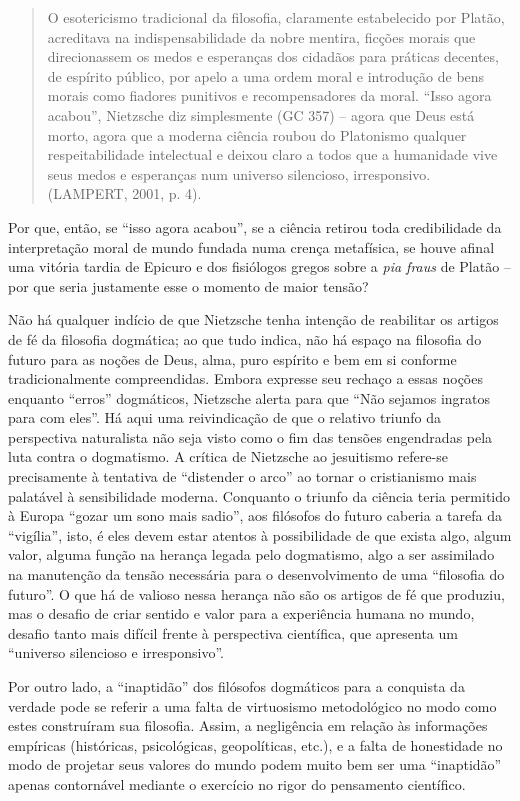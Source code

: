 \documentclass[
	12pt,				%
	openright,			%
	oneside,			%
	a4paper,			%
	english,			%
	french,				%
	spanish,			%
	brazil				%
	]{abntex2}
\begin{document}
\begin{quotation}
O esotericismo tradicional da filosofia, claramente estabelecido por Platão, acreditava na indispensabilidade da nobre mentira, ficções morais que direcionassem os medos e esperanças dos cidadãos para práticas decentes, de espírito público, por apelo a uma ordem moral e introdução de bens morais como fiadores punitivos e recompensadores da moral. “Isso agora acabou”, Nietzsche diz simplesmente (GC 357) – agora que Deus está morto, agora que a moderna ciência roubou do Platonismo qualquer respeitabilidade intelectual e deixou claro a todos que a humanidade vive seus medos e esperanças num universo silencioso, irresponsivo. (LAMPERT, 2001, p. 4).
\end{quotation}

Por que, então, se “isso agora acabou”, se a ciência retirou toda credibilidade da interpretação moral de mundo fundada numa crença metafísica, se houve afinal uma vitória tardia de Epicuro e dos fisiólogos gregos sobre a \textit{pia fraus} de Platão – por que seria justamente esse o momento de maior tensão?

	Não há qualquer indício de que Nietzsche tenha intenção de reabilitar os artigos de fé da filosofia dogmática; ao que tudo indica, não há espaço na filosofia do futuro para as noções de Deus, alma, puro espírito e bem em si conforme tradicionalmente compreendidas. Embora expresse seu rechaço a essas noções enquanto “erros” dogmáticos, Nietzsche alerta para que “Não sejamos ingratos para com eles”. Há aqui uma reivindicação de que o relativo triunfo da perspectiva naturalista não seja visto como o fim das tensões engendradas pela luta contra o dogmatismo. A crítica de Nietzsche ao jesuitismo refere-se precisamente à tentativa de “distender o arco” ao tornar o cristianismo mais palatável à sensibilidade moderna. Conquanto o triunfo da ciência teria permitido à Europa “gozar um sono mais sadio”, aos filósofos do futuro caberia a tarefa da “vigília”, isto, é eles devem estar atentos à possibilidade de que exista algo, algum valor, alguma função na herança legada pelo dogmatismo, algo a ser assimilado na manutenção da tensão necessária para o desenvolvimento de uma “filosofia do futuro”. O que há de valioso nessa herança não são os artigos de fé que produziu, mas o desafio de criar sentido e valor para a experiência humana no mundo, desafio tanto mais difícil frente à perspectiva científica, que apresenta um “universo silencioso e irresponsivo”.
	
	Por outro lado, a “inaptidão” dos filósofos dogmáticos para a conquista da verdade pode se referir a uma falta de virtuosismo metodológico no modo como estes construíram sua filosofia. Assim, a negligência em relação às informações empíricas (históricas, psicológicas, geopolíticas, etc.), e a falta de honestidade no modo de projetar seus valores do mundo podem muito bem ser uma “inaptidão” apenas contornável mediante o exercício no rigor do pensamento científico.
\end{document}
